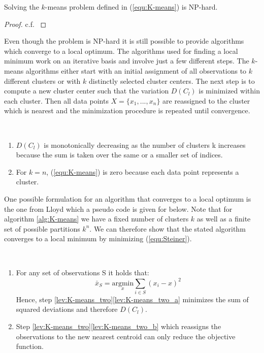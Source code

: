 \begin{corollary}
	Solving the $k$-means problem defined in (\ref{equ:K-means}) is NP-hard.
\end{corollary}
\begin{proof}
c.f. \cite{NP_hard}
\end{proof}

Even though the problem is NP-hard it is still possible to provide algorithms which converge to a local optimum. The algorithms used for finding a local minimum work on an iterative basis   and involve just a few different steps. The $k$-means algorithms either start with an initial assignment of all observations to $k$ different clusters or with $k$ distinctly selected cluster centers. The next step is to compute a new cluster center such that the variation $D(C_l)$ is minimized within each cluster. Then all data points $X = \{x_1, ..., x_n\}$ are reassigned to the cluster which is nearest and the minimization procedure is repeated until convergence. 

\begin{remark}~
	\begin{enumerate}[label=(\roman*)]
		\item $D(C_l)$ is monotonically decreasing as the number of clusters k increases because the sum is taken over the same or a smaller set of indices. 
		\item  For $k=n$, (\ref{equ:K-means}) is zero because each data point represents a cluster. 
	\end{enumerate}
\end{remark}

One possible formulation for an algorithm that converges to a local optimum is the one from Lloyd \cite{lloyd1982least} which a pseudo code is given for below. Note that for algorithm \ref{alg:K-means} we have a fixed number of clusters $k$ as well as a finite set of possible partitions $k^n$. We can therefore show that the stated algorithm converges to a local minimum by minimizing (\ref{equ:Steiner}).

\begin{remark}~
	\begin{enumerate}[label=(\roman*)]
		\item For any set of observations S it holds that: 
			\begin{equation*}
				\bar x_S = \underset{x}{\text{argmin}}\sum_{i \in S} (x_i - x)^2
			\end{equation*}
			Hence, step \ref{lev:K-means_two}\ref{lev:K-means_two_a} minimizes the sum of squared deviations and therefore $D(C_l)$.
		\item Step \ref{lev:K-means_two}\ref{lev:K-means_two_b} which reassigns the observations to the new nearest centroid can only reduce the objective function.
	\end{enumerate}
\end{remark}

